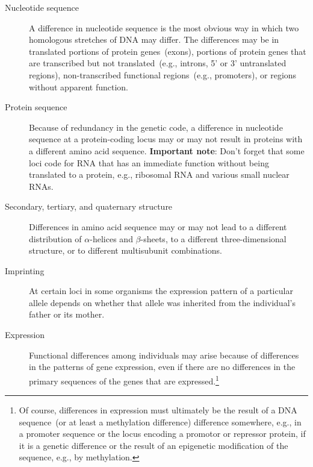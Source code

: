 \begin{description}

\item[Nucleotide sequence] A difference in nucleotide sequence is the
  most obvious way in which two homologous stretches of DNA may
  differ. The differences may be in translated portions of protein
  genes~(exons), portions of protein genes that are transcribed but
  not translated~(e.g., introns, 5' or 3' untranslated regions),
  non-transcribed functional regions~(e.g., promoters), or regions
  without apparent function.

\item[Protein sequence] Because of redundancy in the genetic code, a
  difference in nucleotide sequence at a protein-coding locus may or
  may not result in proteins with a different amino acid
  sequence. {\bf Important note}: Don't forget that some loci code for
  RNA that has an immediate function without being translated to a
  protein, e.g., ribosomal RNA and various small nuclear RNAs.

\item[Secondary, tertiary, and quaternary structure] Differences in
  amino acid sequence may or may not lead to a different distribution
  of $\alpha$-helices and $\beta$-sheets, to a different
  three-dimensional structure, or to different multisubunit
  combinations.

\item[Imprinting] At certain loci in some organisms the expression
  pattern of a particular allele depends on whether that allele was
  inherited from the individual's father or its mother.

\item[Expression] Functional differences among individuals may arise
  because of differences in the patterns of gene expression, even if
  there are no differences in the primary sequences of the genes that
  are expressed.\footnote{Of course, differences in expression must
    ultimately be the result of a DNA sequence~(or at least a
    methylation difference) difference somewhere, e.g., in a promoter
    sequence or the locus encoding a promotor or repressor protein, if
    it is a genetic difference or the result of an epigenetic
    modification of the sequence, e.g., by methylation.}


\end{description}
